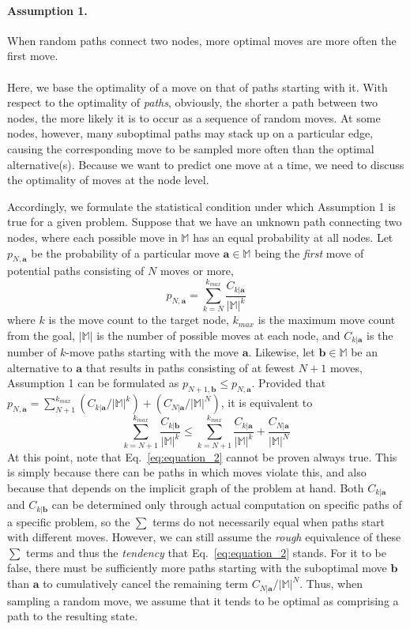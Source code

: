 \documentclass[nohyperref]{article}
\theoremstyle{plain}
\theoremstyle{definition}
\theoremstyle{remark}
\begin{document}
\paragraph{Assumption 1.}
When random paths connect two nodes,
more optimal moves are more often the first move.\\
\\
Here, we base the optimality of a move on that of paths starting with it.
With respect to the optimality of \textit{paths}, obviously, the shorter a path between two nodes, the more likely it is to occur as a sequence of random moves.
At some nodes, however, many suboptimal paths may stack up on a particular edge, causing the corresponding move to be sampled more often than the optimal alternative(s).
Because we want to predict one move at a time, we need to discuss the optimality of moves at the node level.

Accordingly, we formulate the statistical condition under which Assumption 1 is true for a given problem.
Suppose that we have an unknown path connecting two nodes, where each possible move in $\mathbb{M}$ has an equal probability at all nodes.
Let $p_{N,\bm{a}}$ be the probability of a particular move $\bm{a} \in \mathbb{M}$ being the \textit{first} move of potential paths consisting of $N$ moves or more,
\begin{equation}
    p_{N,\bm{a}}=\sum_{k=N}^{k_{max}}\frac{C_{k|\bm{a}}}{|\mathbb{M}|^{k}}
    \label{eq:equation_1}
\end{equation}
where $k$ is the move count to the target node, $k_{max}$ is the maximum move count from the goal, $|\mathbb{M}|$ is the number of possible moves at each node, and $C_{k|\bm{a}}$ is the number of $k$-move paths starting with the move $\bm{a}$.
Likewise, let $\bm{b} \in \mathbb{M}$ be an alternative to $\bm{a}$ that results in paths consisting of at fewest $N+1$ moves, Assumption 1 can be formulated as $p_{N+1,\bm{b}}\leq p_{N,\bm{a}}$.
Provided that $p_{N,\bm{a}}=\sum_{N+1}^{k_{max}}(C_{k|\bm{a}}/|\mathbb{M}|^{k})+(C_{N|\bm{a}}/|\mathbb{M}|^N)$, it is equivalent to
\begin{equation}
    \sum_{k=N+1}^{k_{max}}\frac{C_{k|\bm{b}}}{|\mathbb{M}|^{k}}
    \leq
    \sum_{k=N+1}^{k_{max}}\frac{C_{k|\bm{a}}}{|\mathbb{M}|^{k}}+\frac{C_{N|\bm{a}}}{|\mathbb{M}|^N}
    \label{eq:equation_2}
\end{equation}
At this point, note that Eq.~\ref{eq:equation_2} cannot be proven always true.
This is simply because there can be paths in which moves violate this, and also because that depends on the implicit graph of the problem at hand.
Both $C_{k|\bm{a}}$ and $C_{k|\bm{b}}$ can be determined only through actual computation on specific paths of a specific problem, so the $\sum$ terms do not necessarily equal when paths start with different moves.
However, we can still assume the \textit{rough} equivalence of these $\sum$ terms and thus the \textit{tendency} that Eq.~\ref{eq:equation_2} stands.
For it to be false, there must be sufficiently more paths starting with the suboptimal move $\bm{b}$ than $\bm{a}$ to cumulatively cancel the remaining term ${C_{N|\bm{a}}}/{|\mathbb{M}|^N}$.
Thus, when sampling a random move, we assume that it tends to be optimal as comprising a path to the resulting state.
\end{document}
